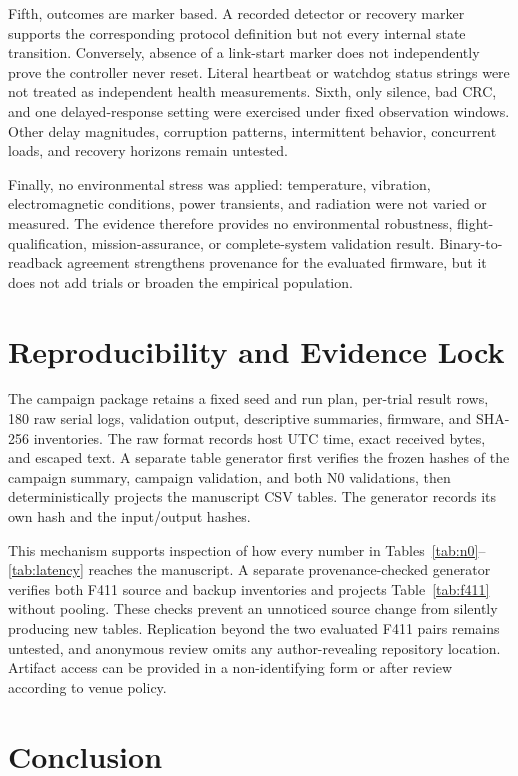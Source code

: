 \documentclass[conference]{IEEEtran}
\begin{document}
Fifth, outcomes are marker based. A recorded detector or recovery marker supports the corresponding protocol definition but not every internal state transition. Conversely, absence of a link-start marker does not independently prove the controller never reset. Literal heartbeat or watchdog status strings were not treated as independent health measurements. Sixth, only silence, bad CRC, and one delayed-response setting were exercised under fixed observation windows. Other delay magnitudes, corruption patterns, intermittent behavior, concurrent loads, and recovery horizons remain untested.

Finally, no environmental stress was applied: temperature, vibration, electromagnetic conditions, power transients, and radiation were not varied or measured. The evidence therefore provides no environmental robustness, flight-qualification, mission-assurance, or complete-system validation result. Binary-to-readback agreement strengthens provenance for the evaluated firmware, but it does not add trials or broaden the empirical population.

\section{Reproducibility and Evidence Lock}

The campaign package retains a fixed seed and run plan, per-trial result rows, 180 raw serial logs, validation output, descriptive summaries, firmware, and SHA-256 inventories. The raw format records host UTC time, exact received bytes, and escaped text. A separate table generator first verifies the frozen hashes of the campaign summary, campaign validation, and both N0 validations, then deterministically projects the manuscript CSV tables. The generator records its own hash and the input/output hashes.

This mechanism supports inspection of how every number in Tables~\ref{tab:n0}--\ref{tab:latency} reaches the manuscript. A separate provenance-checked generator verifies both F411 source and backup inventories and projects Table~\ref{tab:f411} without pooling. These checks prevent an unnoticed source change from silently producing new tables. Replication beyond the two evaluated F411 pairs remains untested, and anonymous review omits any author-revealing repository location. Artifact access can be provided in a non-identifying form or after review according to venue policy.

\section{Conclusion}
\end{document}
